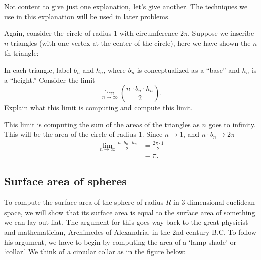 \documentclass[hints,handout,noauthor,nooutcomes,12pt,newpage]{ximera}
\begin{document}
Not content to give just one explanation, let's give another. The
techniques we use in this explanation will be used in later problems.

\begin{problem}
Again, consider the circle of radius $1$ with circumference $2\pi$.
Suppose we inscribe $n$ triangles (with one vertex at the center of
the circle), here we have shown the $n$th triangle:
\begin{image}
\end{image}
In each triangle, label $b_n$ and $h_n$, where $b_n$ is conceptualized
as a ``base'' and $h_n$ is a ``height.''  Consider the limit
\[
\lim_{n\to\infty} \left(\frac{n\cdot b_n\cdot h_n}{2}\right).
\]
Explain what this limit is computing and compute this limit.
\begin{freeResponse}
This limit is computing the sum of the areas of the triangles as $n$
goes to infinity. This will be the area of the circle of radius
$1$. Since $n\to 1$, and $n\cdot b_n\to 2\pi$
\begin{align*}
\lim_{n\to\infty} \frac{n\cdot b_n\cdot h_n}{2} &= \frac{2\pi\cdot 1}{2}\\
&=\pi.
\end{align*}
\end{freeResponse}
\end{problem}


\subsection{Surface area of spheres}

To compute the surface area of the sphere of radius $R$ in $3$-dimensional
euclidean space, we will show that its surface area is equal to the surface
area of something we can lay out flat. The argument for this goes way back to
the great physicist and mathematician, Archimedes of Alexandria, in the $2$nd
century B.C. To follow his argument, we have to begin by computing the area of
a `lamp shade' or `collar.' We think of a circular collar as in the figure
below:
\end{document}
